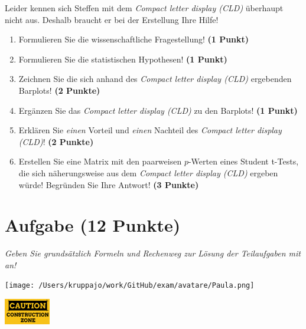 \documentclass[a4paper, 9pt]{scrartcl}\usepackage[]{graphicx}\usepackage[]{xcolor}
\begin{document}
Leider kennen sich Steffen mit dem \textit{Compact letter display (CLD)} überhaupt nicht aus. Deshalb braucht er bei der Erstellung Ihre Hilfe!

\begin{enumerate}
  \item Formulieren Sie die wissenschaftliche Fragestellung! \textbf{(1 Punkt)}
  \item Formulieren Sie die statistischen Hypothesen! \textbf{(1 Punkt)}
\item Zeichnen Sie die sich anhand des \textit{Compact letter display (CLD)} ergebenden Barplots! \textbf{(2 Punkte)}
\item Ergänzen Sie das \textit{Compact letter display (CLD)} zu den Barplots! \textbf{(1 Punkt)}
\item Erklären Sie \textit{einen} Vorteil und \textit{einen} Nachteil des \textit{Compact letter display (CLD)}! \textbf{(2 Punkte)}
\item Erstellen Sie eine Matrix mit den paarweisen $p$-Werten eines Student t-Tests, die sich näherungsweise aus dem \textit{Compact letter display (CLD)} ergeben würde! Begründen Sie Ihre Antwort! \textbf{(3 Punkte)}
\end{enumerate}

 
\clearpage

\section{Aufgabe \hfill (12 Punkte)}

\textit{Geben Sie grundsätzlich Formeln und Rechenweg zur Lösung der Teilaufgaben mit an!} \\[1Ex]
 

 
\begin{minipage}[t]{0.5\textwidth}
\texttt{[image: /Users/kruppajo/work/GitHub/exam/avatare/Paula.png]}
\end{minipage}
\begin{minipage}[t]{0.5\textwidth}
\hfill
\href{https://youtu.be/RagTFFKFbFg}{\includegraphics[width = 2cm]{img/caution}}
\end{minipage}
\vspace{1ex}
\end{document}
